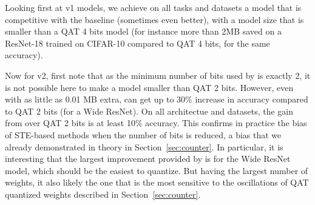 \begin{table}[t!]
\caption{Penalty $\lambda$ and group size $g$ for the v1 and v2 \diffq models reported on Table~\ref{tab:cifar_supp}}
\label{table_hyper_supp}
\vskip 0.15in
\begin{center}
\begin{small}
\begin{sc}
\end{sc}
\end{small}
\end{center}
\vskip -0.1in
\end{table}

Looking first at v1 models, we achieve on all tasks and datasets
a model that is competitive with the baseline (sometimes even better),
with a model size that is smaller than a QAT 4 bits model (for instance more than 2MB saved on a ResNet-18 trained on CIFAR-10 compared to QAT 4 bits, for the same accuracy).

Now for v2, first note that as the minimum number of bits used by \diffq is exactly 2, it is not possible here to make a model smaller than QAT 2 bits. However, even with as little as 0.01 MB extra, \diffq can get up to 30\% increase in accuracy compared to QAT 2 bits (for a Wide ResNet). On all architectue and datasets,
the gain from \diffq over QAT 2 bits is at least 10\% accuracy.
This confirms in practice the bias of STE-based methods when the number
of bits is reduced, a bias that we already demonstrated in theory in Section~\ref{sec:counter}. In particular, it is interesting that the largest
improvement provided by \diffq is for the Wide ResNet model, which should be the easiest to quantize. But having the largest number of weights, it 
also likely the one that is the most sensitive to the oscillations of QAT quantized weights described in Section~\ref{sec:counter}.

